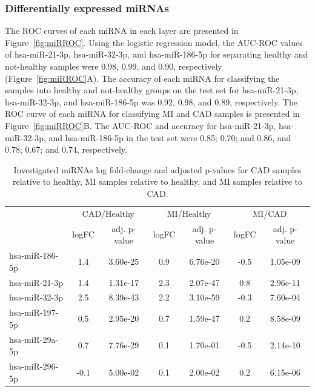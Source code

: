 \documentclass[sn-mathphys,Numbered]{sn-jnl}%
\theoremstyle{thmstyleone}%
\theoremstyle{thmstyletwo}%
\theoremstyle{thmstylethree}%
\begin{document}
\subsubsection{Differentially expressed miRNAs}\label{mirnas-in-degs-1}

The ROC curves of each miRNA in each layer are presented in Figure~\ref{fig:miRROC}. Using the
logistic regression model, the AUC-ROC values of hsa-miR-21-3p, hsa-miR-32-3p, and
hsa-miR-186-5p for separating healthy and not-healthy samples were 0.98, 0.99,
and 0.90, respectively (Figure~\ref{fig:miRROC}A). The accuracy of each
miRNA for classifying the samples into healthy and not-healthy groups on
the test set for hsa-miR-21-3p, hsa-miR-32-3p, and hsa-miR-186-5p was 0.92, 0.98, and 0.89,
respectively. The ROC curve of each miRNA for classifying MI and CAD
samples is presented in Figure~\ref{fig:miRROC}B. The AUC-ROC and
accuracy for hsa-miR-21-3p, hsa-miR-32-3p, and hsa-miR-186-5p in the test set were 0.85;
0.70; and 0.86, and 0.78; 0.67; and 0.74, respectively.

\begin{table}
\centering
\caption{Investigated miRNAs log fold-change and adjusted p-values for CAD samples relative to healthy, MI samples relative to healthy, and MI samples relative to CAD.}
\label{tab:mirExptable}
\begin{tabular}{lcccccc}
\toprule
\multicolumn{1}{c}{} & \multicolumn{2}{c}{CAD/Healthy} & \multicolumn{2}{c}{MI/Healthy} & \multicolumn{2}{c}{MI/CAD} \\
\cmidrule(lr){2-3} \cmidrule(lr){4-5} \cmidrule(lr){6-7}
& logFC & adj. p-value & logFC & adj. p-value & logFC & adj. p-value\\
\midrule
hsa-miR-186-5p & 1.4 & 3.60e-25 & 0.9 & 6.76e-20 & -0.5 & 1.05e-09\\
hsa-miR-21-3p & 1.4 & 1.31e-17 & 2.3 & 2.07e-47 & 0.8 & 2.96e-11\\
hsa-miR-32-3p & 2.5 & 8.39e-43 & 2.2 & 3.10e-59 & -0.3 & 7.60e-04\\
hsa-miR-197-5p & 0.5 & 2.95e-20 & 0.7 & 1.59e-47 & 0.2 & 8.58e-09\\
hsa-miR-29a-5p & 0.7 & 7.76e-29 & 0.1 & 1.70e-01 & -0.5 & 2.14e-10\\
hsa-miR-296-5p & -0.1 & 5.00e-02 & 0.1 & 2.00e-02 & 0.2 & 6.15e-06\\
\bottomrule
\end{tabular}
\end{table}
\end{document}

